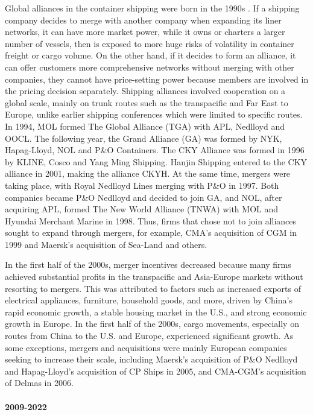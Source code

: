 \documentclass[10pt]{article}
\begin{document}
Global alliances in the container shipping were born in the 1990s \citep{Hirata2017}. If a shipping company decides to merge with another company when expanding its liner networks, it can have more market power, while it owns or charters a larger number of vessels, then is exposed to more huge risks of volatility in container freight or cargo volume. On the other hand, if it decides to form an alliance, it can offer customers more comprehensive networks without merging with other companies, they cannot have price-setting power because members are involved in the pricing decision separately. 
Shipping alliances involved cooperation on a global scale, mainly on trunk routes such as the transpacific and Far East to Europe, unlike earlier shipping conferences which were limited to specific routes. 
In 1994, MOL formed The Global Alliance (TGA) with APL, Nedlloyd and OOCL.
The following year, the Grand Alliance (GA) was formed by NYK, Hapag-Lloyd, NOL and P\&O Containers.
The CKY Alliance was formed in 1996 by KLINE, Cosco and Yang Ming Shipping. 
Hanjin Shipping entered to the CKY alliance in 2001, making the alliance CKYH.
At the same time, mergers were taking place, with Royal Nedlloyd Lines merging with P\&O in 1997.
Both companies became P\&O Nedlloyd and decided to join GA, and NOL, after acquiring APL, formed The New World Alliance (TNWA) with MOL and Hyundai Merchant Marine in 1998. 
Thus, firms that chose not to join alliances sought to expand through mergers, for example, CMA's acquisition of CGM in 1999 and Maersk's acquisition of Sea-Land and others.

In the first half of the 2000s, merger incentives decreased because many firms achieved substantial profits in the transpacific and Asia-Europe markets without resorting to mergers. This was attributed to factors such as increased exports of electrical appliances, furniture, household goods, and more, driven by China's rapid economic growth, a stable housing market in the U.S., and strong economic growth in Europe. In the first half of the 2000s, cargo movements, especially on routes from China to the U.S. and Europe, experienced significant growth.
As some exceptions, mergers and acquisitions were mainly European companies seeking to increase their scale, including Maersk's acquisition of P\&O Nedlloyd and Hapag-Lloyd's acquisition of CP Ships in 2005, and CMA-CGM's acquisition of Delmas in 2006.



\paragraph{2009-2022}
\end{document}
